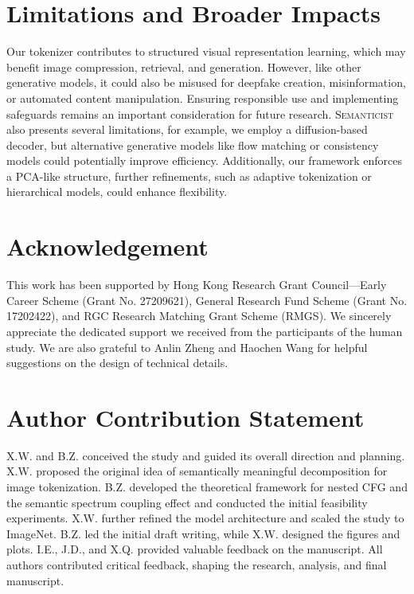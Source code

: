 \documentclass[10pt,twocolumn,letterpaper]{article}
\DeclareRobustCommand{\modelname}{\textsc{Semanticist}\xspace}
\begin{document}
\section*{Limitations and Broader Impacts}
Our tokenizer contributes to structured visual representation learning, which may benefit image compression, retrieval, and generation. 
However, like other generative models, it could also be misused for deepfake creation, misinformation, or automated content manipulation. Ensuring responsible use and implementing safeguards remains an important consideration for future research.
\modelname also presents several limitations, for example, we employ a diffusion-based decoder, but alternative generative models like flow matching or consistency models could potentially improve efficiency.
Additionally, our framework enforces a PCA-like structure, further refinements, such as adaptive tokenization or hierarchical models, could enhance flexibility.

\section*{Acknowledgement}
This work has been supported by Hong Kong Research Grant Council---Early Career Scheme (Grant No. 27209621), General Research Fund Scheme (Grant No. 17202422), and RGC Research Matching Grant Scheme (RMGS).
We sincerely appreciate the dedicated support we received from the participants of the human study. We are also grateful to Anlin Zheng and Haochen Wang for helpful suggestions on the design of technical details.

\section*{Author Contribution Statement}
X.W. and B.Z. conceived the study and guided its overall direction and planning.
X.W. proposed the original idea of semantically meaningful decomposition for image tokenization.
B.Z. developed the theoretical framework for nested CFG and the semantic spectrum coupling effect and conducted the initial feasibility experiments.
X.W. further refined the model architecture and scaled the study to ImageNet.
B.Z. led the initial draft writing, while X.W. designed the figures and plots.
I.E., J.D., and X.Q. provided valuable feedback on the manuscript.
All authors contributed critical feedback, shaping the research, analysis, and final manuscript.

{
\small


}
\end{document}
